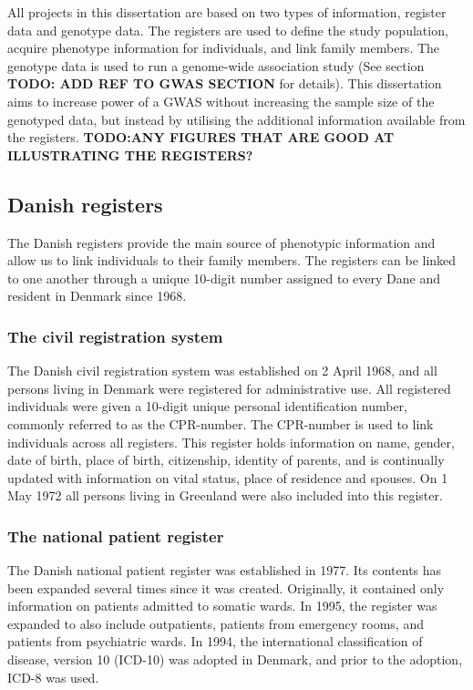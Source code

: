 All projects in this dissertation are based on two types of information, register data and genotype data. The registers are used to define the study population, acquire phenotype information for individuals, and link family members. The genotype data is used to run a genome-wide association study (See section \textbf{TODO: ADD REF TO GWAS SECTION} for details). This dissertation aims to increase power of a GWAS without increasing the sample size of the genotyped data, but instead by utilising the additional information available from the registers. 
\textbf{TODO:ANY FIGURES THAT ARE GOOD AT ILLUSTRATING THE REGISTERS?}

\subsection{Danish registers}
The Danish registers provide the main source of phenotypic information and allow us to link individuals to their family members. The registers can be linked to one another through a unique 10-digit number assigned to every Dane and resident in Denmark since 1968.  

\subsubsection{The civil registration system}
The Danish civil registration system was established on 2 April 1968, and all persons living in Denmark were registered for administrative use. All registered individuals were given a 10-digit unique personal identification number, commonly referred to as the CPR-number. The CPR-number is used to link individuals across all registers. This register holds information on name, gender, date of birth, place of birth, citizenship, identity of parents, and is continually updated with information on vital status, place of residence and spouses. On 1 May 1972 all persons living in Greenland were also included into this register\cite{pedersen2011danish}. 

\subsubsection{The national patient register}
The Danish national patient register was established in 1977. Its contents has been expanded several times since it was created. Originally, it contained only information on patients admitted to somatic wards. In 1995, the register was expanded to also include outpatients, patients from emergency rooms, and patients from psychiatric wards. In 1994, the international classification of disease, version 10 (ICD-10) was adopted in Denmark, and prior to the adoption, ICD-8 was used\cite{lynge2011danish}. 


